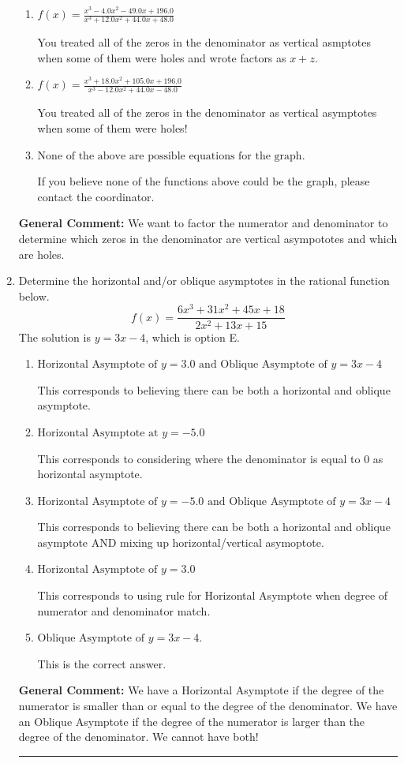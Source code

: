 \documentclass{extbook}[14pt]
\newcommand{\litem}[1]{\item #1

\rule{\textwidth}{0.4pt}}
\begin{document}
\begin{enumerate}
{\begin{enumerate}[label=\Alph*.]
Remember that factors are written as $x-z$. For example, the zero $x=2$ corresponds to the factor $x-(2)$.
\item \( f(x)=\frac{x^{3} -4.0 x^{2} -49.0 x + 196.0}{x^{3} +12.0 x^{2} +44.0 x + 48.0} \)

You treated all of the zeros in the denominator as vertical asmptotes when some of them were holes and wrote factors as $x+z$.
\item \( f(x)=\frac{x^{3} +18.0 x^{2} +105.0 x + 196.0}{x^{3} -12.0 x^{2} +44.0 x -48.0} \)

You treated all of the zeros in the denominator as vertical asymptotes when some of them were holes!
\item \( \text{None of the above are possible equations for the graph.} \)

If you believe none of the functions above could be the graph, please contact the coordinator.
\end{enumerate}

\textbf{General Comment:} We want to factor the numerator and denominator to determine which zeros in the denominator are vertical asympototes and which are holes.
}
\litem{
Determine the horizontal and/or oblique asymptotes in the rational function below.
\[ f(x) = \frac{6x^{3} +31 x^{2} +45 x + 18}{2x^{2} +13 x + 15} \]The solution is \( y = 3x -4 \), which is option E.\begin{enumerate}[label=\Alph*.]
\item \( \text{Horizontal Asymptote of } y = 3.0 \text{ and Oblique Asymptote of } y = 3x -4 \)

This corresponds to believing there can be both a horizontal and oblique asymptote.
\item \( \text{Horizontal Asymptote at } y = -5.0 \)

This corresponds to considering where the denominator is equal to 0 as horizontal asymptote.
\item \( \text{Horizontal Asymptote of } y = -5.0 \text{ and Oblique Asymptote of } y = 3x -4 \)

This corresponds to believing there can be both a horizontal and oblique asymptote AND mixing up horizontal/vertical asymoptote.
\item \( \text{Horizontal Asymptote of } y = 3.0  \)

This corresponds to using rule for Horizontal Asymptote when degree of numerator and denominator match.
\item \( \text{Oblique Asymptote of } y = 3x -4. \)

This is the correct answer.
\end{enumerate}

\textbf{General Comment:} We have a Horizontal Asymptote if the degree of the numerator is smaller than or equal to the degree of the denominator. We have an Oblique Asymptote if the degree of the numerator is larger than the degree of the denominator. We cannot have both!
}
\end{enumerate}
\end{document}
